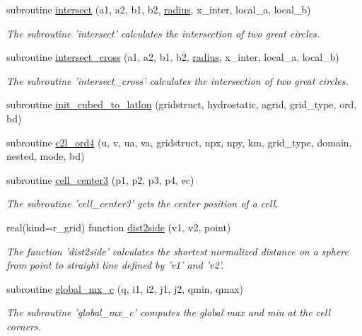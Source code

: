 \begin{DoxyCompactItemize}
subroutine \hyperlink{classfv__grid__utils__mod_a10afa14f31dd7e7622e61232b98446b2}{intersect} (a1, a2, b1, b2, \hyperlink{classfv__grid__utils__mod_a9825bfea45f13a48cc658a3df88d3124}{radius}, x\-\_\-inter, local\-\_\-a, local\-\_\-b)
\begin{DoxyCompactList}\small\item\em The subroutine 'intersect' calculates the intersection of two great circles. \end{DoxyCompactList}\item 
subroutine \hyperlink{classfv__grid__utils__mod_a323c000d99398ede87cd2b258510c96a}{intersect\-\_\-cross} (a1, a2, b1, b2, \hyperlink{classfv__grid__utils__mod_a9825bfea45f13a48cc658a3df88d3124}{radius}, x\-\_\-inter, local\-\_\-a, local\-\_\-b)
\begin{DoxyCompactList}\small\item\em The subroutine 'intersect\-\_\-cross' calculates the intersection of two great circles. \end{DoxyCompactList}\item 
subroutine \hyperlink{classfv__grid__utils__mod_ab691211ffcead13f38d0f82f80024cb2}{init\-\_\-cubed\-\_\-to\-\_\-latlon} (gridstruct, hydrostatic, agrid, grid\-\_\-type, ord, bd)
\item 
subroutine \hyperlink{classfv__grid__utils__mod_ad407af52a37c085d51cc9fae002c6768}{c2l\-\_\-ord4} (u, v, ua, va, gridstruct, npx, npy, km, grid\-\_\-type, domain, nested, mode, bd)
\item 
subroutine \hyperlink{classfv__grid__utils__mod_a0952821694859a7fca0ed15405e49c97}{cell\-\_\-center3} (p1, p2, p3, p4, ec)
\begin{DoxyCompactList}\small\item\em The subroutine 'cell\-\_\-center3' gets the center position of a cell. \end{DoxyCompactList}\item 
real(kind=r\-\_\-grid) function \hyperlink{classfv__grid__utils__mod_ada074199448cb8b1552daaa881561006}{dist2side} (v1, v2, point)
\begin{DoxyCompactList}\small\item\em The function 'dist2side' calculates the shortest normalized distance on a sphere from point to straight line defined by 'v1' and 'v2'. \end{DoxyCompactList}\item 
subroutine \hyperlink{classfv__grid__utils__mod_a81e92ff31b90aa12545bba76526bc9fd}{global\-\_\-mx\-\_\-c} (q, i1, i2, j1, j2, qmin, qmax)
\begin{DoxyCompactList}\small\item\em The subroutine 'global\-\_\-mx\-\_\-c' computes the global max and min at the cell corners. \end{DoxyCompactList}\item 

\end{DoxyCompactItemize}
